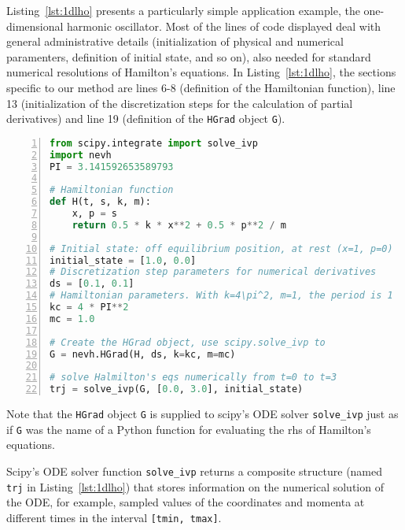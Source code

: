 \documentclass{iopart}
\begin{document}
Listing~\ref{lst:1dlho} presents a particularly simple application example, the
one-dimensional harmonic oscillator. Most of the lines of code displayed deal
with general adminis\-trative details (initialization of physical and numerical
paramenters, definition of initial state, and so on), also needed for standard
numerical resolutions of Hamilton's equations. In Listing~\ref{lst:1dlho}, the
sections specific to our method are lines 6-8 (definition of the Hamiltonian
function), line 13 (initialization of the discretization steps for the
calculation of partial derivatives) and line 19 (definition of the
\texttt{HGrad} object \texttt{G}).

\begin{lstlisting}[caption= {Numerical solution of Hamiltonian's equations for
the one-dimensional linear harmonic oscillator. Note that the user only supplies
code for the system's Hamilton function in lines 7-9. The remaining code lines
define initial state, physical and numerical parameters.},
numbers=left, stepnumber=1, label={lst:1dlho}, language=python
]
from scipy.integrate import solve_ivp
import nevh
PI = 3.141592653589793

# Hamiltonian function
def H(t, s, k, m):
    x, p = s
    return 0.5 * k * x**2 + 0.5 * p**2 / m

# Initial state: off equilibrium position, at rest (x=1, p=0)
initial_state = [1.0, 0.0]
# Discretization step parameters for numerical derivatives
ds = [0.1, 0.1]
# Hamiltonian parameters. With k=4\pi^2, m=1, the period is 1
kc = 4 * PI**2
mc = 1.0

# Create the HGrad object, use scipy.solve_ivp to
G = nevh.HGrad(H, ds, k=kc, m=mc)

# solve Halmilton's eqs numerically from t=0 to t=3
trj = solve_ivp(G, [0.0, 3.0], initial_state)
\end{lstlisting}
Note that the \texttt{HGrad} object \texttt{G} is supplied to scipy's ODE solver
\texttt{solve\_ivp} just as if \texttt{G} was the name of a Python function for
evaluating the rhs of Hamilton's equations.

Scipy's ODE solver function \texttt{solve\_ivp} returns a composite structure
(named \texttt{trj} in Listing~\ref{lst:1dlho}) that stores information
on the numerical solution of the ODE, for example, sampled values of the
coordinates and momenta at different times in the interval \texttt{[tmin,
tmax]}.
\end{document}
